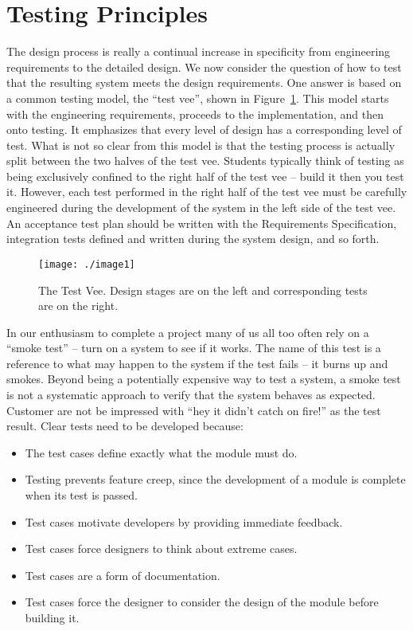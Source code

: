 \section{Testing Principles}
\label{section:testing-principles}

The design process is really a continual increase in specificity from
engineering requirements to the detailed design. We now consider the
question of how to test that the resulting system meets the design
requirements. One answer is based on a common testing model, the ``test
vee'', shown in Figure~\ref{figure:testVee}. 
This model starts with the engineering
requirements, proceeds to the implementation, and then onto testing. It
emphasizes that every level of design has a corresponding level of test.
What is not so clear from this model is that the testing process is
actually split between the two halves of the test vee. Students
typically think of testing as being exclusively confined to the right
half of the test vee -- build it then you test it. However, each test
performed in the right half of the test vee must be carefully engineered
during the development of the system in the left side of the test vee.
An acceptance test plan should be written with the Requirements
Specification, integration tests defined and written during the system
design, and so forth.

\begin{figure}[h]
\centering
\texttt{[image: ./image1]}
\caption{The Test Vee. Design stages are on the left and
corresponding tests are on the right.}
\label{figure:testVee}
\end{figure}

In our enthusiasm to complete a project many of us all too often rely on
a ``smoke test'' -- turn on a system to see if it works. The name of
this test is a reference to what may happen to the system if the test
fails -- it burns up and smokes. Beyond being a potentially expensive
way to test a system, a smoke test is not a systematic approach to
verify that the system behaves as expected. Customer are not be
impressed with ``hey it didn't catch on fire!'' as the test result.
Clear tests need to be developed because:

\begin{itemize}
\item
  The test cases define exactly what the module must do.
\item
  Testing prevents feature creep, since the development of a module is
  complete when its test is passed.
\item
  Test cases motivate developers by providing immediate feedback.
\item
  Test cases force designers to think about extreme cases.
\item
  Test cases are a form of documentation.
\item
  Test cases force the designer to consider the design of the module
  before building it.
\end{itemize}

